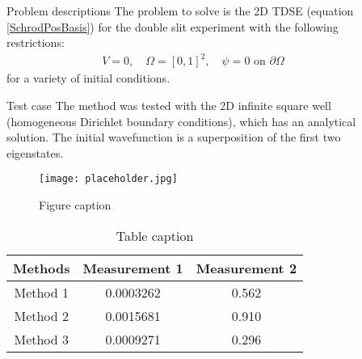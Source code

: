 \documentclass[final]{beamer}
\newlength{\sepwid}
\newlength{\onecolwid}
\newlength{\twocolwid}
\begin{document}
\begin{frame}[t]
\begin{columns}[t]
\begin{column}{\onecolwid}
\end{column} %

\begin{column}{\sepwid}\end{column} %

\begin{column}{\twocolwid} %

\begin{columns}[t,totalwidth=\twocolwid] %

\begin{column}{\onecolwid}\vspace{-.6in} %

\begin{block}{Problem descriptions}
	The problem to solve is the 2D TDSE (equation \eqref{SchrodPosBasis}) for the double slit experiment with the following restrictions:
	\begin{gather}
	V=0,\quad\Omega=\left[0,1\right]^{2},\quad\psi = 0\text{ on } \partial\Omega
	\end{gather}
	for a variety of initial conditions.
\end{block}
\begin{block}{Test case}
The method was tested with the 2D infinite square well (homogeneous Dirichlet boundary conditions), which has an analytical solution. The initial wavefunction is a superposition of the first two eigenstates.

\begin{figure}[H]
\texttt{[image: placeholder.jpg]}
\caption{Figure caption}
\end{figure}
\begin{table}[H]
	\begin{tabular}{c c c}
		\toprule
		\textbf{Methods} & \textbf{Measurement 1} & \textbf{Measurement 2}\\
		\midrule
		Method 1 & 0.0003262 & 0.562 \\
		Method 2 & 0.0015681 & 0.910 \\
		Method 3 & 0.0009271 & 0.296 \\
		\bottomrule
	\end{tabular}
	\caption{Table caption}
\end{table}


\end{block}
\end{column}
\end{columns}
\end{column}
\end{columns}
\end{frame}
\end{document}
